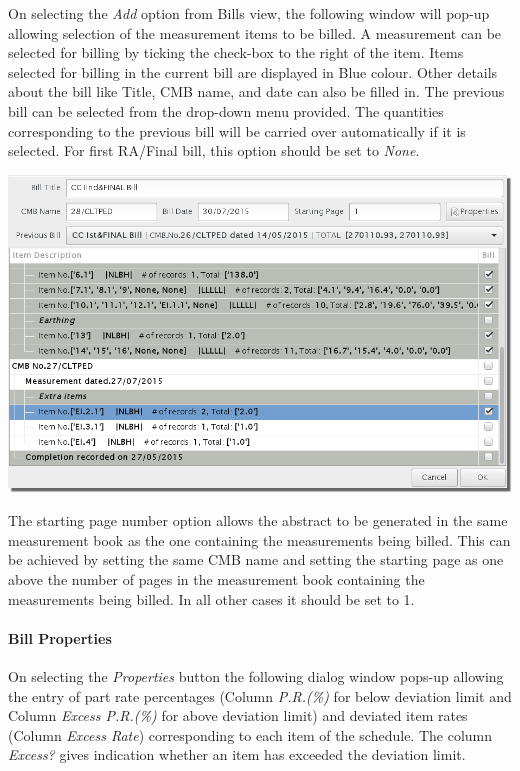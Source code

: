 \documentclass[twoside,a4paper]{refart}
\newenvironment{noteblock}[1]%
{\begin{mdframed}[topline=false,bottomline=false, rightline=false,
		linewidth=2pt, frametitle={#1}]}%
		{\end{mdframed}}
\begin{document}
	 On selecting the \emph{Add} option from Bills view, the following window will pop-up allowing selection of the measurement items to be billed. A measurement can be selected for billing by ticking the check-box to the right of the item. Items selected for billing in the current bill are displayed in Blue colour. Other details about the bill like Title, CMB name, and date can also be filled in. The previous bill can be selected from the drop-down menu provided. The quantities corresponding to the previous bill will be carried over automatically if it is selected. For first RA/Final bill, this option should be set to \emph{None}.\\
	 
	 \begin{maxipage}
	 	\includegraphics[width=1\linewidth]{screenshots/window_bill_edit.png}
	 \end{maxipage}
	 
	 \begin{noteblock}{Note:}
	 	The starting page number option allows the abstract to be generated in the same measurement book as the one containing the measurements being billed. This can be achieved by setting the same CMB name and setting the starting page as one above the number of pages in the measurement book containing the measurements being billed. In all other cases it should be set to 1.
	 \end{noteblock}
	 
	 \paragraph{Bill Properties}
	 
	 On selecting the \emph{Properties} button the following dialog window pops-up allowing the entry of part rate percentages (Column \emph{P.R.(\%)} for below deviation limit and Column \emph{Excess P.R.(\%)} for above deviation limit) and deviated item rates (Column \emph{Excess Rate}) corresponding to each item of the schedule. The column \emph{Excess?} gives indication whether an item has exceeded the deviation limit.
	 
\end{document}
